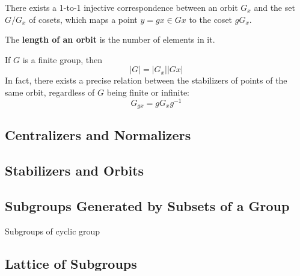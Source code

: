   \begin{theorem}
    There exists a 1-to-1 injective correspondence between an orbit $G_x$ and the set $G / G_{x}$ of cosets, which maps a point $y = g x \in G x $ to the coset $g G_x$. 
  \end{theorem}

  \begin{definition}
    The \textbf{length of an orbit} is the number of elements in it. 
  \end{definition}

  \begin{corollary}
    If $G$ is a finite group, then 
    \begin{equation}
      |G| = |G_x| |G x|
    \end{equation}
    In fact, there exists a precise relation between the stabilizers of points of the same orbit, regardless of $G$ being finite or infinite: 
    \begin{equation}
      G_{g x} = g G_{x} g^{-1}
    \end{equation}
  \end{corollary}

\subsection{Centralizers and Normalizers} 

\subsection{Stabilizers and Orbits}

\subsection{Subgroups Generated by Subsets of a Group} 

  Subgroups of cyclic group

\subsection{Lattice of Subgroups} 

